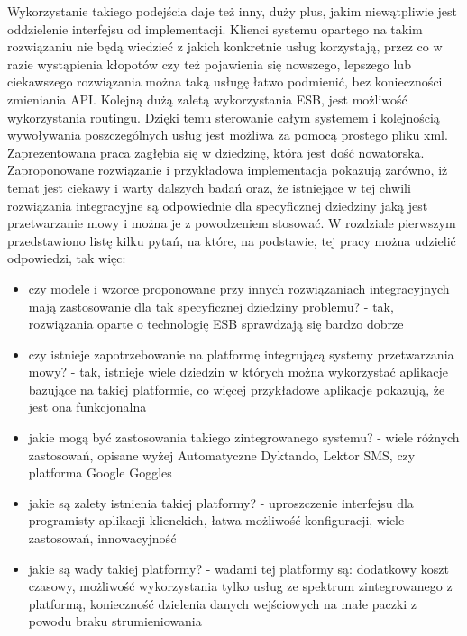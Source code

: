 Wykorzystanie takiego podejścia daje też inny, duży plus, jakim niewątpliwie jest oddzielenie interfejsu od implementacji. Klienci systemu opartego na takim rozwiązaniu nie będą wiedzieć z jakich konkretnie usług korzystają, przez co w razie wystąpienia kłopotów czy też pojawienia się nowszego, lepszego lub ciekawszego rozwiązania można taką usługę łatwo podmienić, bez konieczności zmieniania API. Kolejną dużą zaletą wykorzystania ESB, jest możliwość wykorzystania routingu. Dzięki temu sterowanie całym systemem i kolejnością wywoływania poszczególnych usług jest możliwa za pomocą prostego pliku xml.  \\
Zaprezentowana praca zagłębia się w dziedzinę, która jest dość nowatorska. Zaproponowane rozwiązanie i przykładowa implementacja pokazują zarówno, iż temat jest ciekawy i warty dalszych badań oraz, że istniejące w tej chwili rozwiązania integracyjne są odpowiednie dla specyficznej dziedziny jaką jest przetwarzanie mowy i można je z powodzeniem stosować. W rozdziale pierwszym przedstawiono listę kilku pytań, na które, na podstawie, tej pracy można udzielić odpowiedzi, tak więc:
\begin{itemize}
	\item czy modele i wzorce proponowane przy innych rozwiązaniach integracyjnych mają zastosowanie dla tak specyficznej dziedziny problemu? - tak, rozwiązania oparte o technologię ESB sprawdzają się bardzo dobrze
	\item czy istnieje zapotrzebowanie na platformę integrującą systemy przetwarzania mowy? - tak, istnieje wiele dziedzin w których można wykorzystać aplikacje bazujące na takiej platformie, co więcej przykładowe aplikacje pokazują, że jest ona funkcjonalna
	\item jakie mogą być zastosowania takiego zintegrowanego systemu? - wiele różnych zastosowań, opisane wyżej Automatyczne Dyktando, Lektor SMS, czy platforma Google Goggles 
	\item jakie są zalety istnienia takiej platformy? - uproszczenie interfejsu dla programisty aplikacji klienckich, łatwa możliwość konfiguracji, wiele zastosowań, innowacyjność
	\item jakie są wady takiej platformy? - wadami tej platformy są: dodatkowy koszt czasowy, możliwość wykorzystania tylko usług ze spektrum zintegrowanego z platformą, konieczność dzielenia danych wejściowych na małe paczki z powodu braku strumieniowania
\end{itemize}







